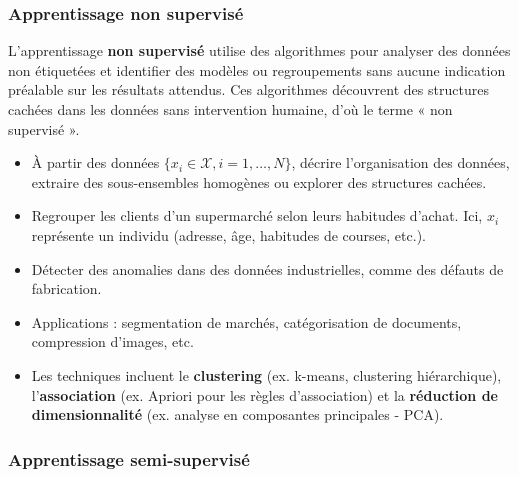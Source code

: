 \documentclass[a4paper,12pt]{article}
\begin{document}
        \subsubsection{Apprentissage non supervisé}
        
        L'apprentissage \textbf{non supervisé} utilise des algorithmes pour analyser des données non étiquetées et identifier des modèles ou regroupements sans aucune indication préalable sur les résultats attendus. Ces algorithmes découvrent des structures cachées dans les données sans intervention humaine, d'où le terme « non supervisé ».
        
        
        \begin{itemize}
            \item  À partir des données \(\{x_i \in \mathcal{X}, i = 1, \ldots, N\}\), décrire l’organisation des données, extraire des sous-ensembles homogènes ou explorer des structures cachées.
        \end{itemize}
        
        
        \begin{itemize}
            \item  Regrouper les clients d’un supermarché selon leurs habitudes d’achat. Ici, \(x_i\) représente un individu (adresse, âge, habitudes de courses, etc.).
            \item  Détecter des anomalies dans des données industrielles, comme des défauts de fabrication.
            \item  Applications : segmentation de marchés, catégorisation de documents, compression d’images, etc.
        \end{itemize}
        
        
        \begin{itemize}
            \item Les techniques incluent le \textbf{clustering} (ex. k-means, clustering hiérarchique), l’\textbf{association} (ex. Apriori pour les règles d’association) et la \textbf{réduction de dimensionnalité} (ex. analyse en composantes principales - PCA).
        \end{itemize}
        
        \subsubsection{Apprentissage semi-supervisé}
        
\end{document}
